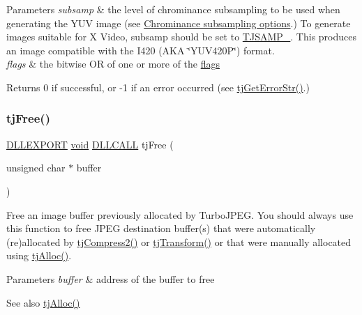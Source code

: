 \begin{DoxyParams}{Parameters}
\hline
{\em subsamp} & the level of chrominance subsampling to be used when generating the Y\+UV image (see \hyperlink{group___turbo_j_p_e_g_ga1d047060ea80bb9820d540bb928e9074}{Chrominance subsampling options}.) To generate images suitable for X Video, {\ttfamily subsamp} should be set to \hyperlink{group___turbo_j_p_e_g_gga1d047060ea80bb9820d540bb928e9074a63085dbf683cfe39e513cdb6343e3737}{T\+J\+S\+A\+M\+P\+\_}. This produces an image compatible with the I420 (A\+KA \char`\"{}\+Y\+U\+V420\+P\char`\"{}) format.\\
\hline
{\em flags} & the bitwise OR of one or more of the \hyperlink{group___turbo_j_p_e_g_ga72ecf4ebe6eb702d3c6f5ca27455e1ec}{flags}\\
\hline
\end{DoxyParams}
\begin{DoxyReturn}{Returns}
0 if successful, or -\/1 if an error occurred (see \hyperlink{group___turbo_j_p_e_g_ga9af79c908ec131b1ae8d52fe40375abf}{tj\+Get\+Error\+Str()}.) 
\end{DoxyReturn}
\mbox{\label{group___turbo_j_p_e_g_ga8c4a1231dc06a450514c835f6471f137}} 
\subsubsection{\texorpdfstring{tj\+Free()}{tjFree()}}
{\footnotesize\ttfamily \hyperlink{turbojpeg_8h_a808e08638be3cba36e36759e5b150de0}{D\+L\+L\+E\+X\+P\+O\+RT} \hyperlink{png_8h_ac9c84fa68bbad002983e35ce3663c686}{void} \hyperlink{turbojpeg_8h_a54b25836118bfac94a53a7b790f3ccb2}{D\+L\+L\+C\+A\+LL} tj\+Free (\begin{DoxyParamCaption}\item[{unsigned char $\ast$}]{buffer }\end{DoxyParamCaption})}

Free an image buffer previously allocated by Turbo\+J\+P\+EG. You should always use this function to free J\+P\+EG destination buffer(s) that were automatically (re)allocated by \hyperlink{group___turbo_j_p_e_g_gaba62b7a98f960839b588579898495cf2}{tj\+Compress2()} or \hyperlink{group___turbo_j_p_e_g_gae403193ceb4aafb7e0f56ab587b48616}{tj\+Transform()} or that were manually allocated using \hyperlink{group___turbo_j_p_e_g_ga5c9234bda6d993cdaffdd89bf81a00ff}{tj\+Alloc()}.


\begin{DoxyParams}{Parameters}
{\em buffer} & address of the buffer to free\\
\hline
\end{DoxyParams}
\begin{DoxySeeAlso}{See also}
\hyperlink{group___turbo_j_p_e_g_ga5c9234bda6d993cdaffdd89bf81a00ff}{tj\+Alloc()} 
\end{DoxySeeAlso}
\mbox{\label{group___turbo_j_p_e_g_ga9af79c908ec131b1ae8d52fe40375abf}} 
